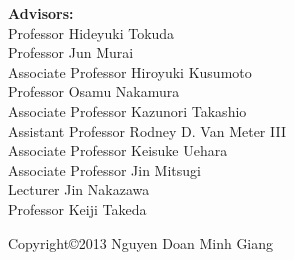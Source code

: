 \documentclass[12pt,a4j]{report}
\begin{document}
\begin{center}
\textbf{{\Large Advisors:}}\\
\vspace{5mm}
{\Large Professor Hideyuki Tokuda}\\
\vspace{2mm}
{\Large Professor Jun Murai}\\
\vspace{2mm}
{\Large Associate Professor Hiroyuki Kusumoto}\\
\vspace{2mm}
{\Large Professor Osamu Nakamura}\\
\vspace{2mm}
{\Large Associate Professor Kazunori Takashio}\\
\vspace{2mm}
{\Large Assistant Professor Rodney D. Van Meter III}\\
\vspace{2mm}
{\Large Associate Professor Keisuke Uehara}\\
\vspace{2mm}
{\Large Associate Professor Jin Mitsugi}\\
\vspace{2mm}
{\Large Lecturer Jin Nakazawa}\\
\vspace{2mm}
{\Large Professor Keiji Takeda}\\

\vspace{12mm}

{\large Copyright\copyright  2013 Nguyen Doan Minh Giang}

\end{center}

\newpage

\pagestyle{plain}
\baselineskip=9mm

%
\tableofcontents
\listoftables
\listoffigures

\newpage











%



\newpage
\ \
\end{document}
